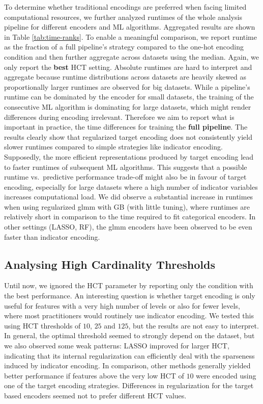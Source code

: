 \documentclass[smallextended]{svjour3}       %
\begin{document}
To determine whether traditional encodings are preferred when facing limited computational resources, we further analyzed runtimes of the whole analysis pipeline for different encoders and ML algorithms.
Aggregated results are shown in Table \ref{tab:time-ranks}.
To enable a meaningful comparison, we report runtime as the fraction of a full pipeline's strategy compared to the one-hot encoding condition and then further aggregate across datasets using the median.
Again, we only report the \textbf{best} HCT setting.
Absolute runtimes are hard to interpret and aggregate because runtime distributions across datasets are heavily skewed as proportionally larger runtimes are observed for big datasets.
While a pipeline's runtime can be dominated by the encoder for small datasets, the training of the consecutive ML algorithm is dominating for large datasets, which might render differences during encoding irrelevant.
Therefore we aim to report what is important in practice, the time differences for training the \textbf{full pipeline}.
The results clearly show that regularized target encoding does not consistently yield slower runtimes compared to simple strategies like indicator encoding. Supposedly, the more efficient representations produced by target encoding lead to faster runtimes of subsequent ML algorithms.
This suggests that a possible runtime vs.~predictive performance trade-off might also be in favour of target encoding, especially for large datasets where a high number of indicator variables increases computational load.
We did observe a substantial increase in runtimes when using regularized glmm with GB (with little tuning), where runtimes are relatively short in comparison to the time required to fit categorical encoders.
In other settings (LASSO, RF), the glmm encoders have been observed to be even faster than indicator encoding.

\hypertarget{analysing-high-cardinality-thresholds}{%
\subsection{Analysing High Cardinality Thresholds}\label{analysing-high-cardinality-thresholds}}

\label{sec:hct_study}

Until now, we ignored the HCT parameter by reporting only the condition with the best performance.
An interesting question is whether target encoding is only useful for features with a very high number of levels or also for fewer levels, where most practitioners would routinely use indicator encoding.
We tested this using HCT thresholds of \(10\), \(25\) and \(125\), but the results are not easy to interpret.
In general, the optimal threshold seemed to strongly depend on the dataset, but we also observed some weak patterns:
LASSO improved for larger HCT, indicating that its internal regularization can efficiently deal with the sparseness induced by indicator encoding.
In comparison, other methods generally yielded better performance if features above the very low HCT of \(10\) were encoded using one of the target encoding strategies.
Differences in regularization for the target based encoders seemed not to prefer different HCT values.
\end{document}
